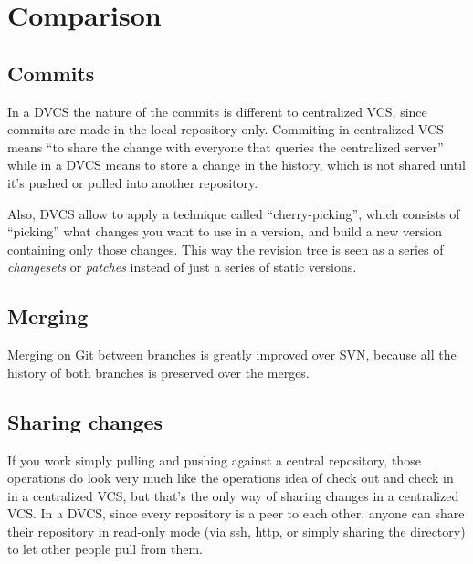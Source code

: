 \documentclass[%
	final,
	notitlepage,
	narroweqnarray,
	inline,
	twoside,
	]{ieee}
\begin{document}
\section{Comparison}

\subsection{Commits}
In a DVCS the nature of the commits is different to centralized VCS, since commits are made in the local repository only. 
Commiting in centralized VCS means ``to share the change with everyone that queries the centralized server'' while in a 
DVCS means to store a change in the history, which is not shared until it's pushed or pulled into another repository.

Also, DVCS allow to apply a technique called ``cherry-picking'', 
which consists of ``picking'' what changes you want to use in a version, and build 
a new version containing only those changes. This way the revision tree is seen as a 
series of \emph{changesets} or \emph{patches} instead of just a series of static versions.

\subsection{Merging}
Merging on Git between branches is greatly improved over SVN, because all the history of 
both branches is preserved over the merges. %

\subsection{Sharing changes}
If you work simply pulling and pushing against a central repository, those operations do look 
very much like the operations idea of check out and check in in a centralized VCS, 
but that's the only way of sharing changes in a centralized VCS.
In a DVCS, since every repository is a peer to each other, anyone can share their repository in 
read-only mode (via ssh, http, or simply sharing the directory) to let other people pull from them. 


\end{document}
